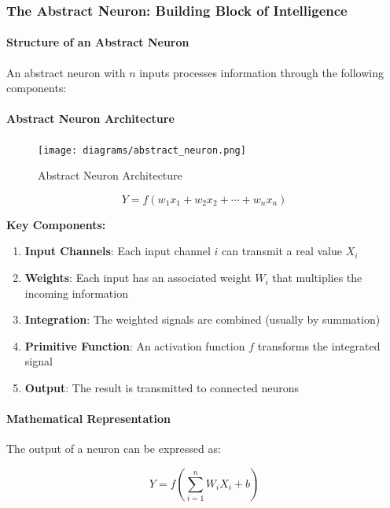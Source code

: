 \subsubsection{The Abstract Neuron: Building Block of Intelligence}

\paragraph{Structure of an Abstract Neuron}

An abstract neuron with $n$ inputs processes information through the following components:

\paragraph{Abstract Neuron Architecture}

\begin{figure}[h!]
\centering
\texttt{[image: diagrams/abstract\_neuron.png]}
\caption{Abstract Neuron Architecture}
\end{figure}

\begin{equation}
Y = f\left(w_1 x_1 + w_2 x_2 + \cdots + w_n x_n\right)
\end{equation}

\textbf{Key Components:}

\begin{enumerate}
\item \textbf{Input Channels}: Each input channel $i$ can transmit a real value $X_i$
\item \textbf{Weights}: Each input has an associated weight $W_i$ that multiplies the incoming information
\item \textbf{Integration}: The weighted signals are combined (usually by summation)
\item \textbf{Primitive Function}: An activation function $f$ transforms the integrated signal
\item \textbf{Output}: The result is transmitted to connected neurons
\end{enumerate}

\paragraph{Mathematical Representation}

The output of a neuron can be expressed as:

\begin{equation}
Y = f\left(\sum_{i=1}^{n} W_i X_i + b\right)
\end{equation}

